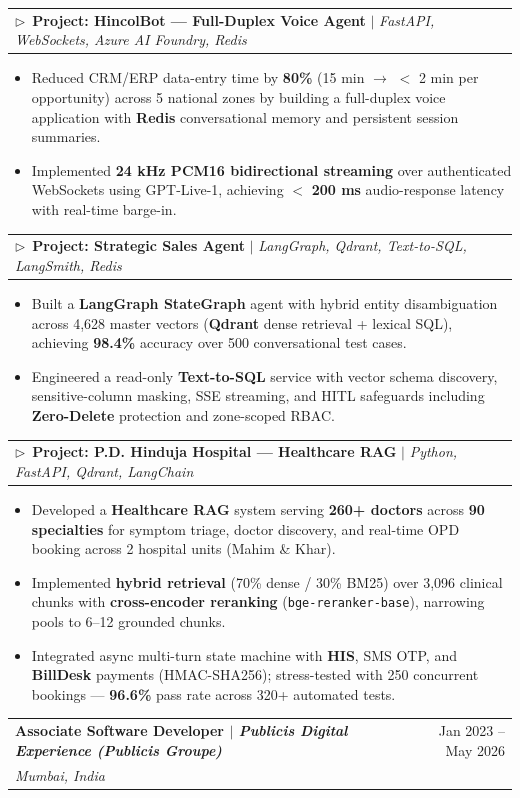 \documentclass[a4paper,11pt]{article}
\makeatletter
\newcommand{\resumeItem}[1]{
  \item\small{
    {#1 \vspace{-2pt}}
  }
}
\newcommand{\resumeSubheading}[4]{
  \vspace{-2pt}\item
    \begin{tabular*}{0.97\textwidth}[t]{l@{\extracolsep{\fill}}r}
      \textbf{#1} & #2 \\
      \textit{\small#3} & \textit{\small #4} \\
    \end{tabular*}\vspace{-6pt}
}
\newcommand{\resumeProjectHeading}[2]{
    \item\hspace{6pt}
    \begin{tabular*}{0.95\textwidth}{l@{\extracolsep{\fill}}r}
      \small#1 & #2 \\
    \end{tabular*}\vspace{-6pt}
}
\newcommand{\resumeItemListStart}{\begin{itemize}}
\newcommand{\resumeItemListEnd}{\end{itemize}\vspace{-5pt}}
\makeatother
\begin{document}
      \resumeProjectHeading
          {$\triangleright$\ \textbf{Project: HincolBot --- Full-Duplex Voice Agent} $|$ \emph{FastAPI, WebSockets, Azure AI Foundry, Redis}}{}
      \resumeItemListStart
        \resumeItem{Reduced CRM/ERP data-entry time by \textbf{80\%} (15 min $\to$ $<$ 2 min per opportunity) across 5 national zones by building a full-duplex voice application with \textbf{Redis} conversational memory and persistent session summaries.}
        \resumeItem{Implemented \textbf{24 kHz PCM16 bidirectional streaming} over authenticated WebSockets using GPT-Live-1, achieving $<$ \textbf{200 ms} audio-response latency with real-time barge-in.}
      \resumeItemListEnd

      \resumeProjectHeading
          {$\triangleright$\ \textbf{Project: Strategic Sales Agent} $|$ \emph{LangGraph, Qdrant, Text-to-SQL, LangSmith, Redis}}{}
      \resumeItemListStart
        \resumeItem{Built a \textbf{LangGraph StateGraph} agent with hybrid entity disambiguation across 4,628 master vectors (\textbf{Qdrant} dense retrieval + lexical SQL), achieving \textbf{98.4\%} accuracy over 500 conversational test cases.}
        \resumeItem{Engineered a read-only \textbf{Text-to-SQL} service with vector schema discovery, sensitive-column masking, SSE streaming, and HITL safeguards including \textbf{Zero-Delete} protection and zone-scoped RBAC.}
      \resumeItemListEnd

      \resumeProjectHeading
          {$\triangleright$\ \textbf{Project: P.D. Hinduja Hospital --- Healthcare RAG} $|$ \emph{Python, FastAPI, Qdrant, LangChain}}{}
      \resumeItemListStart
        \resumeItem{Developed a \textbf{Healthcare RAG} system serving \textbf{260+ doctors} across \textbf{90 specialties} for symptom triage, doctor discovery, and real-time OPD booking across 2 hospital units (Mahim \& Khar).}
        \resumeItem{Implemented \textbf{hybrid retrieval} (70\% dense / 30\% BM25) over 3,096 clinical chunks with \textbf{cross-encoder reranking} (\texttt{bge-reranker-base}), narrowing pools to 6--12 grounded chunks.}
        \resumeItem{Integrated async multi-turn state machine with \textbf{HIS}, SMS OTP, and \textbf{BillDesk} payments (HMAC-SHA256); stress-tested with 250 concurrent bookings --- \textbf{96.6\%} pass rate across 320+ automated tests.}
      \resumeItemListEnd

    \vspace{3pt}
    \resumeSubheading
      {Associate Software Developer $|$ \textit{\textnormal{Publicis Digital Experience (Publicis Groupe)}}}{Jan 2023 -- May 2026}
      {Mumbai, India}{}
\end{document}
